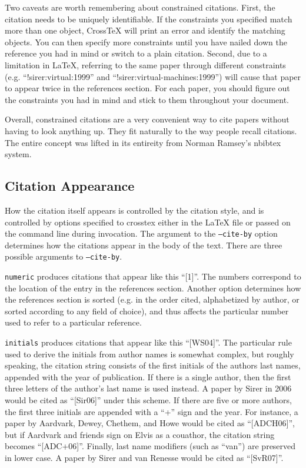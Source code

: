 \documentclass{article}
\newcommand{\XTeX}{Cross\TeX}
\begin{document}
Two caveats are worth remembering about constrained citations. First, the citation needs to be
uniquely identifiable. If the constraints you specified match more than one object, \XTeX{} will 
print an error and identify the matching objects. You can then specify more constraints until
you have nailed down the reference you had in mind or switch to a plain citation. Second, 
due to a limitation in LaTeX, referring to the same paper through different constraints (e.g. 
``!sirer:virtual:1999'' and ``!sirer:virtual-machines:1999'') will cause that paper to appear
twice in the references section. For each paper, you should figure out the constraints you had
in mind and stick to them throughout your document. 

Overall, constrained citations are a very convenient way to cite papers without having to
look anything up. They fit naturally to the way people recall citations. The entire concept
was lifted in its entireity from Norman Ramsey's nbibtex system.

\subsection{Citation Appearance}

How the citation itself appears is controlled by the citation style,
and is controlled by options specified to crosstex either in the LaTeX
file or passed on the command line during invocation. The argument to
the \texttt{--cite-by} option determines how the citations appear in
the body of the text.  There are three possible arguments to
\texttt{--cite-by}.

\texttt{numeric} produces citations that appear like this ``[1]''. The
numbers correspond to the location of the entry in the references
section. Another option determines how the references section is
sorted (e.g. in the order cited, alphabetized by author, or sorted
according to any field of choice), and thus affects the particular
number used to refer to a particular reference.

\texttt{initials} produces citations that appear like this ``[WS04]''. The particular rule used to derive the initials from 
author names is somewhat complex, but roughly speaking, the citation string consists of the first initials of the authors
last names, appended with the year of publication. If there is a single author, then the first three letters of the
author's last name is used instead. A paper by Sirer in 2006 would be cited as ``[Sir06]'' under this scheme. If there are five or more authors, the first three initials are appended with a ``+'' sign and the year. For instance, a paper by Aardvark, Dewey, Chethem, and Howe
would be cited as ``[ADCH06]'', but if Aardvark and friends sign on Elvis as a couathor, the citation string becomes ``[ADC+06]''. 
Finally, last name modifiers (such as ``van'') are preserved in lower case. A paper by Sirer and van Renesse would be 
cited as ``[SvR07]''.
\end{document}
